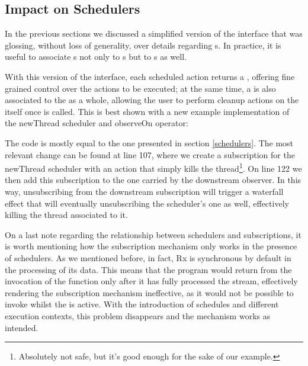 \subsection{Impact on Schedulers}

In the previous sections we discussed a simplified version of the  interface that was glossing, without loss of generality, over details regarding s. In practice, it is useful to associate s not only to s but to s as well. 


With this version of the interface, each scheduled action returns a , offering fine grained control over the actions to be executed; at the same time, a  is also associated to the  as a whole, allowing the user to perform cleanup actions on the  itself once  is called. This is best shown with a new example implementation of the newThread scheduler and observeOn operator:


The code is mostly equal to the one presented in section \ref{schedulers}. The most relevant change can be found at line 107, where we create a subscription for the newThread scheduler with an action that simply kills the thread\footnote{Absolutely not safe, but it's good enough for the sake of our example.}. On line 122 we then add this subscription to the one carried by the downstream observer. In this way, unsubscribing from the downstream subscription will trigger a waterfall effect that will eventually unsubscribing the scheduler's one as well, effectively killing the thread associated to it.

On a last note regarding the relationship between schedulers and subscriptions, it is worth mentioning how the subscription mechanism only works in the presence of schedulers. As we mentioned before, in fact, Rx is synchronous by default in the processing of its data. This means that the program would return from the invocation of the  function only after it has fully processed the stream, effectively rendering the subscription mechanism ineffective, as it would not be possible to invoke  whilst the  is active. With the introduction of schedules and different execution contexts, this problem disappears and the mechanism works as intended.

